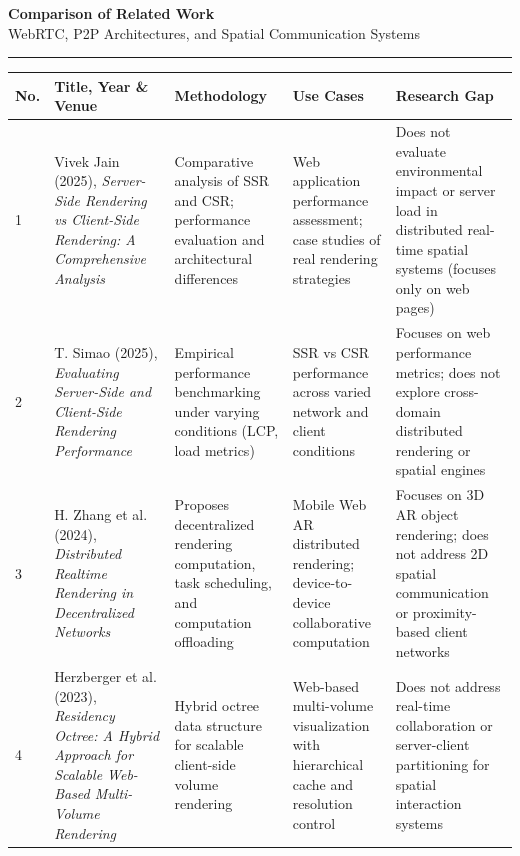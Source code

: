 \documentclass[11pt,a4paper]{article}
\begin{document}
\begin{center}
  {\Large\bfseries Comparison of Related Work}\\[4pt]
  {\large WebRTC, P2P Architectures, and Spatial Communication Systems}\\[6pt]
  \rule{0.6\textwidth}{1pt}
\end{center}

\vspace{1em}

\begin{table}[htbp]
\centering
\small
\setlength{\tabcolsep}{6pt}
\renewcommand{\arraystretch}{1.5}

\begin{tabularx}{\textwidth}{|C{0.6cm}|L{3.2cm}|L{3.3cm}|L{3.0cm}|L{3.3cm}|}
\hline

\textbf{No.} &
\textbf{Title, Year \& Venue} &
\textbf{Methodology} &
\textbf{Use Cases} &
\textbf{Research Gap} \\
\hline

1 &
Vivek Jain (2025), \textit{Server-Side Rendering vs Client-Side Rendering: A Comprehensive Analysis} &
Comparative analysis of SSR and CSR; performance evaluation and architectural differences &
Web application performance assessment; case studies of real rendering strategies &
Does not evaluate environmental impact or server load in distributed real-time spatial systems (focuses only on web pages) \\
\hline

2 &
T. Simao (2025), \textit{Evaluating Server-Side and Client-Side Rendering Performance} &
Empirical performance benchmarking under varying conditions (LCP, load metrics) &
SSR vs CSR performance across varied network and client conditions &
Focuses on web performance metrics; does not explore cross-domain distributed rendering or spatial engines \\
\hline

3 &
H. Zhang et al. (2024), \textit{Distributed Realtime Rendering in Decentralized Networks} &
Proposes decentralized rendering computation, task scheduling, and computation offloading &
Mobile Web AR distributed rendering; device-to-device collaborative computation &
Focuses on 3D AR object rendering; does not address 2D spatial communication or proximity-based client networks \\
\hline

4 &
Herzberger et al. (2023), \textit{Residency Octree: A Hybrid Approach for Scalable Web-Based Multi-Volume Rendering} &
Hybrid octree data structure for scalable client-side volume rendering &
Web-based multi-volume visualization with hierarchical cache and resolution control &
Does not address real-time collaboration or server-client partitioning for spatial interaction systems \\
\hline


\end{tabularx}
\end{table}
\end{document}
